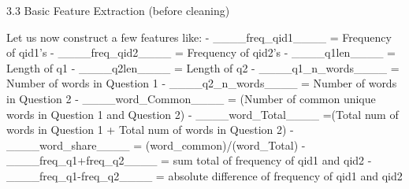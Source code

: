 \documentclass[11pt]{article}
\begin{document}
    3.3 Basic Feature Extraction (before cleaning)

    Let us now construct a few features like: - \_\_\_\_freq\_qid1\_\_\_\_ =
Frequency of qid1's - \_\_\_\_freq\_qid2\_\_\_\_ = Frequency of qid2's -
\_\_\_\_q1len\_\_\_\_ = Length of q1 - \_\_\_\_q2len\_\_\_\_ = Length of
q2 - \_\_\_\_q1\_n\_words\_\_\_\_ = Number of words in Question 1 -
\_\_\_\_q2\_n\_words\_\_\_\_ = Number of words in Question 2 -
\_\_\_\_word\_Common\_\_\_\_ = (Number of common unique words in
Question 1 and Question 2) - \_\_\_\_word\_Total\_\_\_\_ =(Total num of
words in Question 1 + Total num of words in Question 2) -
\_\_\_\_word\_share\_\_\_\_ = (word\_common)/(word\_Total) -
\_\_\_\_freq\_q1+freq\_q2\_\_\_\_ = sum total of frequency of qid1 and
qid2 - \_\_\_\_freq\_q1-freq\_q2\_\_\_\_ = absolute difference of
frequency of qid1 and qid2
\end{document}
